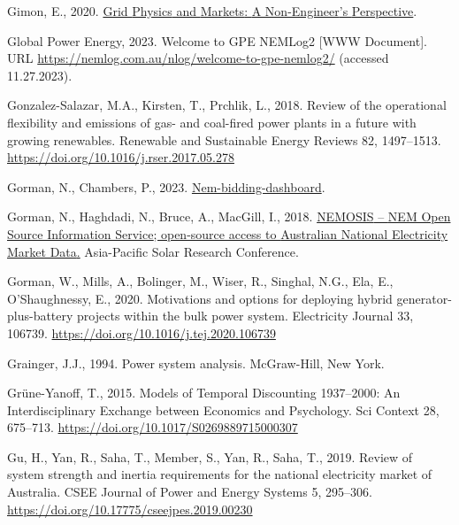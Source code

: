 \documentclass[12pt,a4paper,]{report}
\newlength{\cslhangindent}
\newenvironment{CSLReferences}[2] %
 {%
  \setlength{\parindent}{0pt}
  \ifodd #1 \everypar{\setlength{\hangindent}{\cslhangindent}}\ignorespaces\fi
  \ifnum #2 > 0
  \setlength{\parskip}{#2\baselineskip}
  \fi
 }%
 {}
\begin{document}
\begin{CSLReferences}{1}{0}
\leavevmode{}%
Gimon, E., 2020.
\href{https://www.esig.energy/download/plenary-1-grid-physics-and-markets-a-non-engineers-perspective-eric-gimon/}{Grid
{Physics} and {Markets}: {A Non-Engineer}'s {Perspective}}.

\leavevmode{}%
Global Power Energy, 2023. Welcome to {GPE NEMLog2} {[}WWW Document{]}.
URL \url{https://nemlog.com.au/nlog/welcome-to-gpe-nemlog2/} (accessed
11.27.2023).

\leavevmode{}%
Gonzalez-Salazar, M.A., Kirsten, T., Prchlik, L., 2018. Review of the
operational flexibility and emissions of gas- and coal-fired power
plants in a future with growing renewables. Renewable and Sustainable
Energy Reviews 82, 1497--1513.
\url{https://doi.org/10.1016/j.rser.2017.05.278}

\leavevmode{}%
Gorman, N., Chambers, P., 2023.
\href{https://github.com/UNSW-CEEM/nem-bidding-dashboard}{Nem-bidding-dashboard}.

\leavevmode{}%
Gorman, N., Haghdadi, N., Bruce, A., MacGill, I., 2018.
\href{https://www.researchgate.net/publication/329798805}{{NEMOSIS} --
{NEM Open Source Information Service}; open-source access to {Australian
National Electricity Market Data}.} Asia-Pacific Solar Research
Conference.

\leavevmode{}%
Gorman, W., Mills, A., Bolinger, M., Wiser, R., Singhal, N.G., Ela, E.,
O'Shaughnessy, E., 2020. Motivations and options for deploying hybrid
generator-plus-battery projects within the bulk power system.
Electricity Journal 33, 106739.
\url{https://doi.org/10.1016/j.tej.2020.106739}

\leavevmode{}%
Grainger, J.J., 1994. Power system analysis. McGraw-Hill, New York.

\leavevmode{}%
Grüne-Yanoff, T., 2015. Models of {Temporal Discounting} 1937--2000: {An
Interdisciplinary Exchange} between {Economics} and {Psychology}. Sci
Context 28, 675--713. \url{https://doi.org/10.1017/S0269889715000307}

\leavevmode{}%
Gu, H., Yan, R., Saha, T., Member, S., Yan, R., Saha, T., 2019. Review
of system strength and inertia requirements for the national electricity
market of {Australia}. CSEE Journal of Power and Energy Systems 5,
295--306. \url{https://doi.org/10.17775/cseejpes.2019.00230}


\end{CSLReferences}
\end{document}
